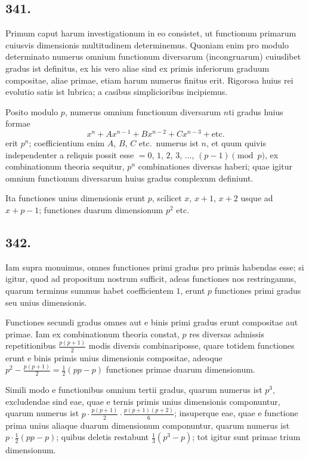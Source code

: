 \documentclass[12pt,a4paper]{article}
\begin{document}
\subsection*{341.}

Primum caput harum investigationum in eo consistet, ut functionum primarum cuiusvis dimensionis multitudinem determinemus. Quoniam enim pro modulo determinato numerus omnium functionum diversarum (incongruarum) cuiuslibet gradus ist definitus, ex his vero aliae sind ex primis inferiorum graduum compositae, aliae primae, etiam harum numerus finitus erit. Rigorosa huius rei evolutio satis ist lubrica; a casibus simplicioribus incipiemus.

Posito modulo $p$, numerus omnium functionum diversarum $n$ti gradus huius formae
\[
x^n + Ax^{n-1} + Bx^{n-2} + Cx^{n-3} + \text{etc.}
\]
erit $p^n$; coefficientium enim $A$, $B$, $C$ etc.~numerus ist $n$, et quum quivis independenter a reliquis possit esse $=0$, $1$, $2$, $3$, $\ldots$, $(p-1)\pmod{p}$, ex combinationum theoria sequitur, $p^n$ combinationes diversas haberi; quae igitur omnium functionum diversarum huius gradus complexum definiunt.

Ita functiones unius dimensionis erunt $p$, scilicet $x$, $x+1$, $x+2$ usque ad $x+p-1$; functiones duarum dimensionum $p^2$ etc.

\subsection*{342.}

Iam supra monuimus, omnes functiones primi gradus pro primis habendas esse; si igitur, quod ad propositum nostrum sufficit, adeas functiones nos restringamus, quarum terminus summus habet coefficientem $1$, erunt $p$ functiones primi gradus seu unius dimensionis.

Functiones secundi gradus omnes aut e binis primi gradus erunt compositae aut primae. Iam ex combinationum theoria constat, $p$ res diversas admissis repetitionibus $\frac{p(p+1)}{2}$ modis diversis combinariposse, quare totidem functiones erunt e binis primis unius dimensionis compositae, adeoque $p^2 - \frac{p(p+1)}{2} = \frac{1}{2}(pp-p)$ functiones primae duarum dimensionum.

Simili modo e functionibus omnium tertii gradus, quarum numerus ist $p^3$, excludendae sind eae, quae e ternis primis unius dimensionis componuntur, quarum numerus ist $p\cdot\frac{p(p+1)}{2}\cdot\frac{p(p+1)(p+2)}{6}$; insuperque eae, quae e functione prima unius aliaque duarum dimensionum componuntur, quarum numerus ist $p\cdot\frac{1}{2}(pp-p)$; quibus deletis restabunt $\frac{1}{3}(p^3-p)$; tot igitur sunt primae trium dimensionum.
\end{document}
